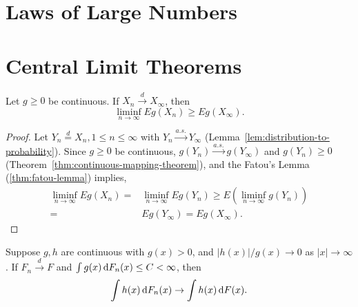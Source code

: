\section{Laws of Large Numbers}

\section{Central Limit Theorems}

\begin{exercise}\label{ex:fatou-lemma-distribution}
	Let \(g\geq 0\) be continuous. If \(X_{n}\stackrel{d}{\rightarrow}X_{\infty}\), then
	\begin{equation*}
		\liminf_{n\rightarrow\infty}Eg\left(X_{n}\right)\geq Eg\left(X_{\infty}\right).
	\end{equation*}
\end{exercise}

\begin{proof}
	Let \(Y_n\stackrel{d}{=}X_n,1\leq n\leq\infty\) with \(Y_n\stackrel{a.s.}{\rightarrow}Y_\infty\) (Lemma~\ref{lem:distribution-to-probability}).
	Since \(g\geq 0\) be continuous, \(g(Y_n)\stackrel{a.s.}{\rightarrow}g(Y_\infty)\) and \(g(Y_n)\geq 0\) (Theorem~\ref{thm:continuous-mapping-theorem}), and the Fatou's Lemma (\ref{thm:fatou-lemma}) implies,
	\begin{equation*}
		\begin{aligned}
			\liminf_{n\rightarrow\infty}Eg(X_n)= & \liminf_{n\rightarrow\infty}Eg(Y_n)\geq E\left(\liminf_{n\rightarrow\infty}g(Y_n)\right) \\
			=                                    & Eg(Y_\infty)=Eg(X_\infty).
		\end{aligned}
	\end{equation*}
\end{proof}

\begin{exercise}
	Suppose \(g,h\) are continuous with \(g(x)>0\), and \(|h(x)|/g(x)\rightarrow 0\) as \(|x|\rightarrow\infty\). If \(F_{n}\stackrel{d}{\rightarrow}F\) and \(\int g(x)\mathop{}\!\mathrm{d} F_{n}(x)\leq C<\infty\), then
	\begin{equation*}
		\int h(x)\mathop{}\!\mathrm{d} F_{n}(x) \rightarrow \int h(x)\mathop{}\!\mathrm{d} F(x).
	\end{equation*}
\end{exercise}

